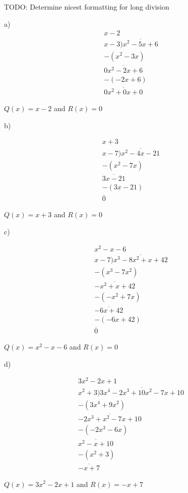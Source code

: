 \documentclass[]{report}
\begin{document}
TODO: Determine nicest formatting for long division

a) 
\begin{align*}
	x - 2\\
x-3 ) \overline{x^2 - 5x + 6}\\
- (x^2 -3x)\\
\overline{0x^2 -2x + 6} \\
- (-2x + 6)\\
\overline{0x^2 + 0x + 0}
\end{align*}

$Q(x) = x-2 $ and $R(x) = 0$

b)

\begin{align*}
x + 3\\
x-7) \overline{x^2 -4x -21}\\
- (x^2 - 7x)\\
\overline{3x - 21}\\
-(3x - 21)\\
\overline{0}
\end{align*}

$Q(x) = x + 3$ and $R(x) = 0$

c)

\begin{align*}
x^2 - x - 6\\
x-7 ) \overline{x^3 - 8x^2 + x + 42}\\
- (x^3 - 7x^2)\\
\overline{-x^2 + x + 42}\\
- (-x^2 + 7x)\\
\overline{-6x + 42}\\
- (-6x + 42) \\
\overline{0}
\end{align*}

$Q(x) = x^2 -x -6$ and $R(x) = 0$

d) 

\begin{align*}
3x^2 - 2x + 1\\
x^2 + 3) \overline{3x^4 - 2x^3 + 10x^2 -7x + 10}\\
-(3x^4 + 9x^2)\\
\overline{-2x^3 + x^2 -7x + 10} \\
-(-2x^3 - 6x)\\
\overline{x^2 - x + 10} \\
- (x^2 + 3) \\
\overline{-x + 7}
\end{align*}

$Q(x) = 3x^2 - 2x + 1$ and $R(x) = -x + 7$
\end{document}
